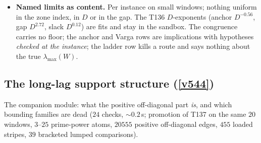 \documentclass[11pt,a4paper]{article}
\begin{document}
\begin{itemize}[leftmargin=1.5em]
$0$ violations), so minimising over the ladder is legitimate --- and it does not reach the
preregistered bar $1/2$ on any rung (best $3.080$) while the \emph{measured} bad mass is
$\le0.0120$. The localisation term alone already exceeds the bar ($0.542$): the loss is the bound,
and the bar is not moved.
\item \textbf{Named limits as content.} Per instance on small windows; nothing uniform in the zone
index, in $D$ or in the gap. The T136 $D$-exponents (anchor $D^{-0.56}$, gap $D^{2.72}$, slack
$D^{0.12}$) are fits and stay in the sandbox. The congruence carries no floor; the anchor and Varga
rows are implications with hypotheses \emph{checked at the instance}; the ladder row kills a route and
says nothing about the true $\lambda_{\max}(W)$.
\end{itemize}

\subsection{The long-lag support structure (\texorpdfstring{\vref{v544}}{v544})}\label{sec:v544}
The companion module: what the positive off-diagonal part \emph{is}, and which bounding families are
dead  ($24$ checks, ${\sim}0.2$\,s; promotion of T137 on the same
$20$ windows, $3$--$25$ prime-power atoms, $20555$ positive off-diagonal edges, $455$ loaded stripes,
$39$ bracketed lumped comparisons).
\end{document}
